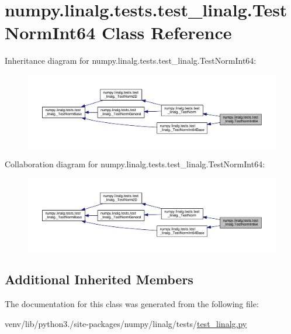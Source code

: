 \hypertarget{classnumpy_1_1linalg_1_1tests_1_1test__linalg_1_1TestNormInt64}{}\section{numpy.\+linalg.\+tests.\+test\+\_\+linalg.\+Test\+Norm\+Int64 Class Reference}
\label{classnumpy_1_1linalg_1_1tests_1_1test__linalg_1_1TestNormInt64}


Inheritance diagram for numpy.\+linalg.\+tests.\+test\+\_\+linalg.\+Test\+Norm\+Int64\+:
\nopagebreak
\begin{figure}[H]
\begin{center}
\leavevmode
\includegraphics[width=350pt]{classnumpy_1_1linalg_1_1tests_1_1test__linalg_1_1TestNormInt64__inherit__graph}
\end{center}
\end{figure}


Collaboration diagram for numpy.\+linalg.\+tests.\+test\+\_\+linalg.\+Test\+Norm\+Int64\+:
\nopagebreak
\begin{figure}[H]
\begin{center}
\leavevmode
\includegraphics[width=350pt]{classnumpy_1_1linalg_1_1tests_1_1test__linalg_1_1TestNormInt64__coll__graph}
\end{center}
\end{figure}
\subsection*{Additional Inherited Members}


The documentation for this class was generated from the following file\+:\begin{DoxyCompactItemize}
\item 
venv/lib/python3./site-\/packages/numpy/linalg/tests/\hyperlink{test__linalg_8py}{test\+\_\+linalg.\+py}\end{DoxyCompactItemize}
